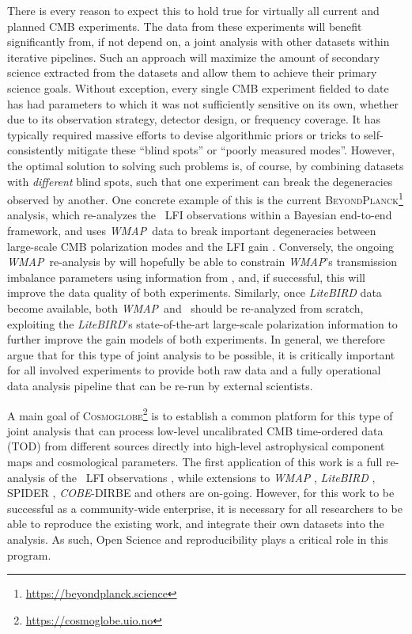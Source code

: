 \documentclass[twocolumn]{aa}
\def\WMAP{\textit{WMAP}}
\def\COBE{\textit{COBE}}
\newcommand{\BP}{\textsc{BeyondPlanck}}
\newcommand{\cosmoglobe}{\textsc{Cosmoglobe}}
\begin{document}
There is every reason to expect this to hold true for virtually all current and planned CMB experiments. The data from these experiments will benefit significantly from, if not depend on, a joint analysis with other datasets within iterative pipelines. Such an approach will maximize the amount of secondary science extracted from the datasets and allow them to achieve their primary science goals. Without exception, every single CMB experiment fielded to date has had parameters to which it was not sufficiently sensitive on its own, whether due to its observation strategy, detector design, or frequency coverage. It has typically required massive efforts to devise algorithmic priors or tricks to self-consistently mitigate these ``blind spots'' or ``poorly measured modes''. However, the optimal solution to solving such problems is, of course, by combining datasets with \emph{different} blind spots, such that one experiment can break the degeneracies observed by another. One concrete example of this is the current \BP\footnote{\url{https://beyondplanck.science}} analysis, which re-analyzes the \Planck\ LFI observations within a Bayesian end-to-end framework, and uses \WMAP\ data to break important degeneracies between large-scale CMB polarization modes and the LFI gain \citep{bp01,bp07}. Conversely, the ongoing \WMAP\ re-analysis by \citet{bp17} will hopefully be able to constrain \WMAP's transmission imbalance parameters using information from \Planck, and, if successful, this will improve the data quality of both experiments. Similarly, once \textit{LiteBIRD} data become available, both \WMAP\ and \Planck\ should be re-analyzed from scratch, exploiting the \textit{LiteBIRD}'s state-of-the-art large-scale polarization information to further improve the gain models of both experiments. In general, we therefore argue that for this type of joint analysis to be possible, it is critically important for all involved experiments to provide both raw data and a fully operational data analysis pipeline that can be re-run by external scientists.

A main goal of \cosmoglobe\footnote{\url{https://cosmoglobe.uio.no}} is to establish a common platform for this type of joint analysis that can process low-level uncalibrated CMB time-ordered data (TOD) from different sources directly into high-level astrophysical component maps and cosmological
parameters. The first application of this work is a full re-analysis of the \Planck\ LFI observations \citep[][and references therein]{bp01}, while extensions to \textit{WMAP} \citep{bp17}, \textit{LiteBIRD} \citep{litebird2022}, SPIDER \citep{spider21}, \COBE-DIRBE \citep{hauser:1998} and others are on-going. However, for this work to be successful as a community-wide enterprise, it is necessary for all researchers to be able to reproduce the existing work, and integrate their own datasets into the analysis. As such, Open Science and reproducibility plays a critical role in this program.
\end{document}
